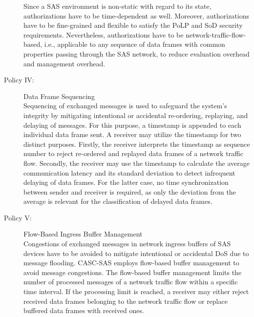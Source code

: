 \begin{description}
    Since a SAS environment is non-static with regard to its state, authorizations have to be time-dependent as well.
    Moreover, authorizations have to be fine-grained and flexible to satisfy the PoLP and SoD security requirements.
    Nevertheless, authorizations have to be network-traffic-flow-based, i.e., applicable to any sequence of data frames with common properties passing through the SAS network, to reduce evaluation overhead and management overhead.
    \item[Policy IV:] Data Frame Sequencing\\%
    Sequencing of exchanged messages is used to safeguard the system's integrity by mitigating intentional or accidental re-ordering, replaying, and delaying of messages.
    For this purpose, a timestamp is appended to each individual data frame sent.
    A receiver may utilize the timestamp for two distinct purposes.
    Firstly, the receiver interprets the timestamp as sequence number to reject re-ordered and replayed data frames of a network traffic flow.
    Secondly, the receiver may use the timestamp to calculate the average communication latency and its standard deviation to detect infrequent delaying of data frames.
    For the latter case, no time synchronization between sender and receiver is required, as only the deviation from the average is relevant for the classification of delayed data frames.
    \item[Policy V:] Flow-Based Ingress Buffer Management\\%
    Congestions of exchanged messages in network ingress buffers of SAS devices have to be avoided to mitigate intentional or accidental DoS due to message flooding.
    CASC-SAS employs flow-based buffer management to avoid message congestions.
    The flow-based buffer management limits the number of processed messages of a network traffic flow within a specific time interval.
    If the processing limit is reached, a receiver may either reject received data frames belonging to the network traffic flow or replace buffered data frames with received ones.
\end{description}
